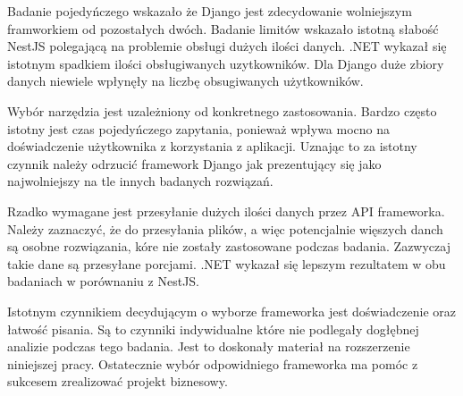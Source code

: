 Badanie pojedyńczego wskazało że Django jest zdecydowanie wolniejszym framworkiem od pozostałych dwóch.
Badanie limitów wskazało istotną słabość NestJS polegającą na problemie obsługi dużych ilości danych. .NET wykazał się istotnym spadkiem ilości obsługiwanych uzytkowników.
Dla Django duże zbiory danych niewiele wpłynęły na liczbę obsugiwanych użytkowników.

Wybór narzędzia jest uzależniony od konkretnego zastosowania.
Bardzo często istotny jest czas pojedyńczego zapytania, ponieważ wpływa mocno na doświadczenie użytkownika z korzystania z aplikacji.
Uznając to za istotny czynnik należy odrzucić framework Django jak prezentujący się jako najwolniejszy na tle innych badanych rozwiązań.

Rzadko wymagane jest przesyłanie dużych ilości danych przez API frameworka.
Należy zaznaczyć, że do przesyłania plików, a więc potencjalnie więszych danch są osobne rozwiązania, kóre nie zostały zastosowane podczas badania.
Zazwyczaj takie dane są przesyłane porcjami.
.NET wykazał się lepszym rezultatem w obu badaniach w porównaniu z NestJS.

Istotnym czynnikiem decydującym o wyborze frameworka jest doświadczenie oraz łatwość pisania.
Są to czynniki indywidualne które nie podlegały dogłębnej analizie podczas tego badania.
Jest to doskonały materiał na rozszerzenie niniejszej pracy.
Ostatecznie wybór odpowidniego frameworka ma pomóc z sukcesem zrealizować projekt biznesowy.